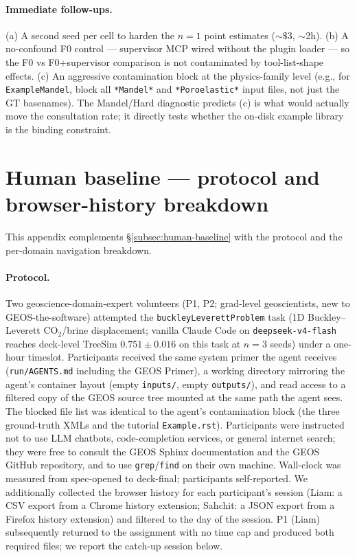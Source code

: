 \documentclass{article}
\begin{document}
\paragraph{Immediate follow-ups.} (a) A second seed per cell to harden the $n=1$ point estimates ($\sim\$3$, $\sim$2h). (b) A no-confound F0 control --- supervisor MCP wired without the plugin loader --- so the F0 vs F0+supervisor comparison is not contaminated by tool-list-shape effects. (c) An aggressive contamination block at the physics-family level (e.g., for \texttt{ExampleMandel}, block all \texttt{*Mandel*} and \texttt{*Poroelastic*} input files, not just the GT basenames). The Mandel/Hard diagnostic predicts (c) is what would actually move the consultation rate; it directly tests whether the on-disk example library is the binding constraint.

\section{Human baseline --- protocol and browser-history breakdown}
\label{app:human-browser}

This appendix complements \S\ref{subsec:human-baseline} with the protocol and the per-domain navigation breakdown.

\paragraph{Protocol.} Two geoscience-domain-expert volunteers (P1, P2; grad-level geoscientists, new to GEOS-the-software) attempted the \texttt{buckleyLeverettProblem} task (1D Buckley--Leverett CO$_2$/brine displacement; vanilla Claude Code on \texttt{deepseek-v4-flash} reaches deck-level TreeSim $0.751 \pm 0.016$ on this task at $n=3$ seeds) under a one-hour timeslot. Participants received the same system primer the agent receives (\texttt{run/AGENTS.md} including the GEOS Primer), a working directory mirroring the agent's container layout (empty \texttt{inputs/}, empty \texttt{outputs/}), and read access to a filtered copy of the GEOS source tree mounted at the same path the agent sees. The blocked file list was identical to the agent's contamination block (the three ground-truth XMLs and the tutorial \texttt{Example.rst}). Participants were instructed not to use LLM chatbots, code-completion services, or general internet search; they were free to consult the GEOS Sphinx documentation and the GEOS GitHub repository, and to use \texttt{grep}/\texttt{find} on their own machine. Wall-clock was measured from spec-opened to deck-final; participants self-reported. We additionally collected the browser history for each participant's session (Liam: a CSV export from a Chrome history extension; Sahchit: a JSON export from a Firefox history extension) and filtered to the day of the session. P1 (Liam) subsequently returned to the assignment with no time cap and produced both required files; we report the catch-up session below.
\end{document}
